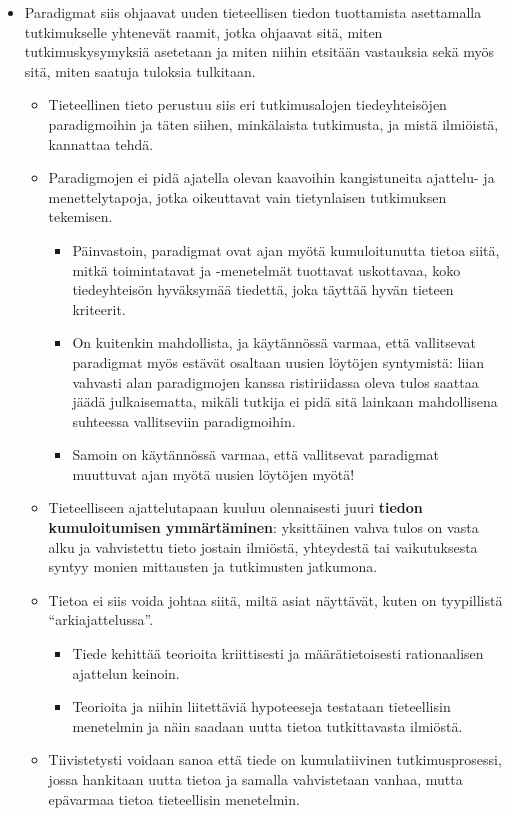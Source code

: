 \documentclass[
]{book}
\providecommand{\tightlist}{%
  \setlength{\itemsep}{0pt}\setlength{\parskip}{0pt}}
\begin{document}
\begin{itemize}
\tightlist
\item
  Paradigmat siis ohjaavat uuden tieteellisen tiedon tuottamista asettamalla tutkimukselle yhtenevät raamit, jotka ohjaavat sitä, miten tutkimuskysymyksiä asetetaan ja miten niihin etsitään vastauksia sekä myös sitä, miten saatuja tuloksia tulkitaan.

  \begin{itemize}
  \tightlist
  \item
    Tieteellinen tieto perustuu siis eri tutkimusalojen tiedeyhteisöjen paradigmoihin ja täten siihen, minkälaista tutkimusta, ja mistä ilmiöistä, kannattaa tehdä.
  \item
    Paradigmojen ei pidä ajatella olevan kaavoihin kangistuneita ajattelu- ja menettelytapoja, jotka oikeuttavat vain tietynlaisen tutkimuksen tekemisen.

    \begin{itemize}
    \tightlist
    \item
      Päinvastoin, paradigmat ovat ajan myötä kumuloitunutta tietoa siitä, mitkä toimintatavat ja -menetelmät tuottavat uskottavaa, koko tiedeyhteisön hyväksymää tiedettä, joka täyttää hyvän tieteen kriteerit.
    \item
      On kuitenkin mahdollista, ja käytännössä varmaa, että vallitsevat paradigmat myös estävät osaltaan uusien löytöjen syntymistä: liian vahvasti alan paradigmojen kanssa ristiriidassa oleva tulos saattaa jäädä julkaisematta, mikäli tutkija ei pidä sitä lainkaan mahdollisena suhteessa vallitseviin paradigmoihin.
    \item
      Samoin on käytännössä varmaa, että vallitsevat paradigmat muuttuvat ajan myötä uusien löytöjen myötä!
    \end{itemize}
  \item
    Tieteelliseen ajattelutapaan kuuluu olennaisesti juuri \textbf{tiedon kumuloitumisen ymmärtäminen}: yksittäinen vahva tulos on vasta alku ja vahvistettu tieto jostain ilmiöstä, yhteydestä tai vaikutuksesta syntyy monien mittausten ja tutkimusten jatkumona.
  \item
    Tietoa ei siis voida johtaa siitä, miltä asiat näyttävät, kuten on tyypillistä ``arkiajattelussa''.

    \begin{itemize}
    \tightlist
    \item
      Tiede kehittää teorioita kriittisesti ja määrätietoisesti rationaalisen ajattelun keinoin.
    \item
      Teorioita ja niihin liitettäviä hypoteeseja testataan tieteellisin menetelmin ja näin saadaan uutta tietoa tutkittavasta ilmiöstä.
    \end{itemize}
  \item
    Tiivistetysti voidaan sanoa että tiede on kumulatiivinen tutkimusprosessi, jossa hankitaan uutta tietoa ja samalla vahvistetaan vanhaa, mutta epävarmaa tietoa tieteellisin menetelmin.


\end{itemize}
\end{itemize}
\end{document}
